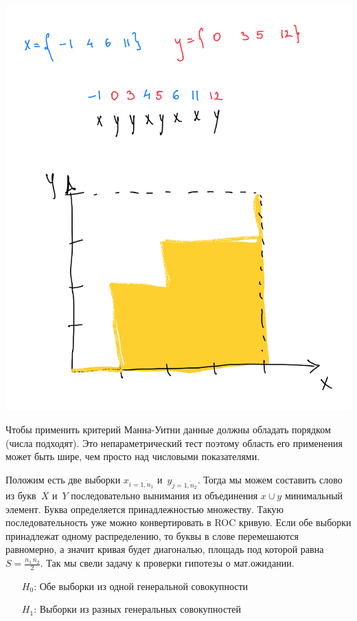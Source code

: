\documentclass[a4paper, oneside]{book}
\begin{document}
\begin{marginfigure}
    \includegraphics[width=1.1\columnwidth]{pics/mann-whitney_roc.pdf}
    \label{fig:mann-whitney_roc}
\end{marginfigure}
Чтобы применить критерий Манна-Уитни данные должны обладать порядком (числа
подходят). Это непараметрический тест поэтому область его применения может быть
шире, чем просто над числовыми показателями.

Положим есть две выборки $x_{i=\overline{1, n_1}}$ и~$y_{j=\overline{1, n_2}}$.
Тогда мы можем составить слово из букв~$X$ и~$Y$ последовательно вынимания из
объединения $x \cup y$ минимальный элемент. Буква определяется принадлежностью
множеству. Такую последовательность уже можно конвертировать в ROC кривую. Если
обе выборки принадлежат одному распределению, то буквы в слове перемешаются
равномерно, а значит кривая будет диагональю, площадь под которой равна
$S=\frac{n_1\,n_2}{2}$. Так мы свели задачу к проверки гипотезы о мат.ожидании.

\begin{itemize}
    \item[$H_0$:] Обе выборки из одной генеральной совокупности
    \item[$H_1$:] Выборки из разных генеральных совокупностей
\end{itemize}
\end{document}
